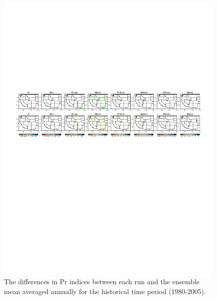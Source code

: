 \documentclass{ametsoc}
\begin{document}
\clearpage
 
 
\begin{figure}
\begin{center}
\includegraphics[width=6in]{wd_index_member_minus_ensembleMean_annual_Hist.pdf}
\caption{The differences in Pr indices between each run and the ensemble mean averaged annually for the historical time period (1980-2005).}
\label{fig:S1}
\end{center}
\end{figure}
\end{document}
